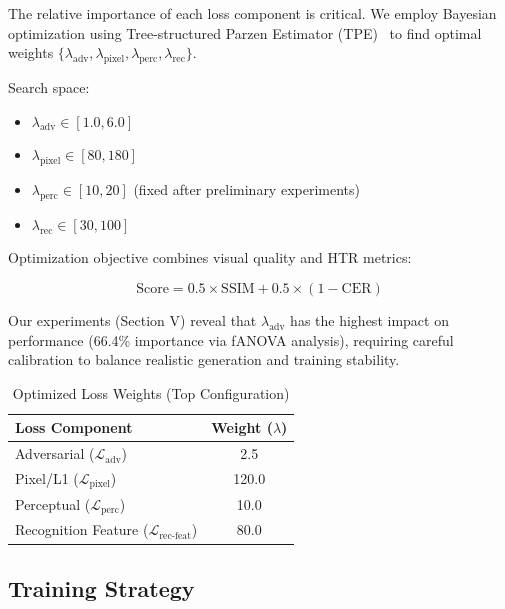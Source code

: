 \documentclass[journal]{IEEEtran}
\begin{document}
The relative importance of each loss component is critical. We employ Bayesian optimization using Tree-structured Parzen Estimator (TPE)~\cite{bergstra2011algorithms} to find optimal weights $\{\lambda_{\text{adv}}, \lambda_{\text{pixel}}, \lambda_{\text{perc}}, \lambda_{\text{rec}}\}$.

Search space:
\begin{itemize}
    \item $\lambda_{\text{adv}} \in [1.0, 6.0]$
    \item $\lambda_{\text{pixel}} \in [80, 180]$
    \item $\lambda_{\text{perc}} \in [10, 20]$ (fixed after preliminary experiments)
    \item $\lambda_{\text{rec}} \in [30, 100]$
\end{itemize}

Optimization objective combines visual quality and HTR metrics:

\begin{equation}
\text{Score} = 0.5 \times \text{SSIM} + 0.5 \times (1 - \text{CER})
\end{equation}

Our experiments (Section V) reveal that $\lambda_{\text{adv}}$ has the highest impact on performance (66.4\% importance via fANOVA analysis), requiring careful calibration to balance realistic generation and training stability.

\begin{table}[!t]
\renewcommand{\arraystretch}{1.3}
\caption{Optimized Loss Weights (Top Configuration)}
\label{table_optimal_weights}
\centering
\begin{tabular}{|l|c|}
\hline
\textbf{Loss Component} & \textbf{Weight ($\lambda$)} \\
\hline
Adversarial ($\mathcal{L}_{\text{adv}}$) & 2.5 \\
Pixel/L1 ($\mathcal{L}_{\text{pixel}}$) & 120.0 \\
Perceptual ($\mathcal{L}_{\text{perc}}$) & 10.0 \\
Recognition Feature ($\mathcal{L}_{\text{rec-feat}}$) & 80.0 \\
\hline
\end{tabular}
\end{table}

\subsection{Training Strategy}
\end{document}
